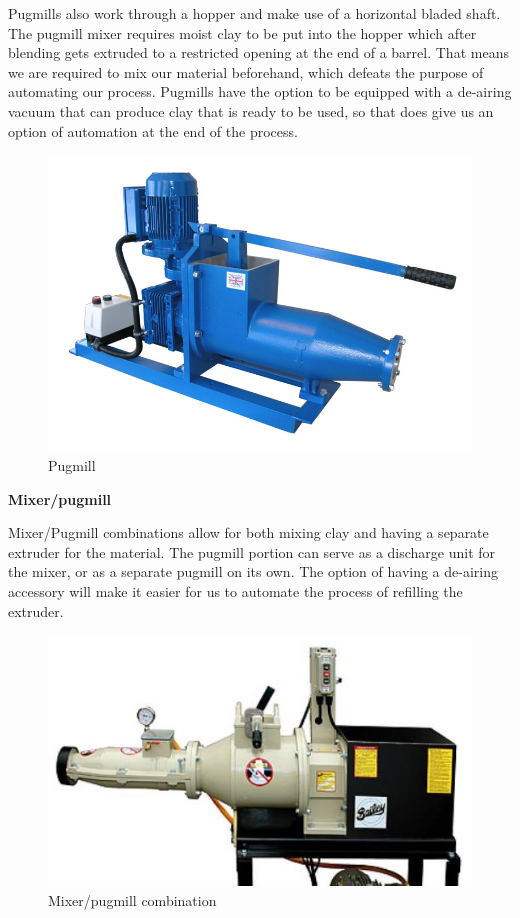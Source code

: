 \documentclass[12pt, a4paper]{article}
\begin{document}
Pugmills also work through a hopper and make use of a horizontal bladed shaft. The pugmill mixer requires moist clay to be put into the hopper which after blending gets extruded to a restricted opening at the end of a barrel. That means we are required to mix our material beforehand, which defeats the purpose of automating our process. Pugmills have the option to be equipped with a de-airing vacuum that can produce clay that is ready to be used, so that does give us an option of automation at the end of the process. 
\begin{figure}[H]
	\centering
	\includegraphics[width=12cm, keepaspectratio]{pugmill}
	\caption{Pugmill}
\end{figure}
	\newpage

\textbf{Mixer/pugmill}

Mixer/Pugmill combinations allow for both mixing clay and having a separate extruder for the material. The pugmill portion can serve as a discharge unit for the mixer, or as a separate pugmill on its own. The option of having a de-airing accessory will make it easier for us to automate the process of refilling the extruder.
\begin{figure}[H]
	\centering
	\includegraphics[width=12cm, keepaspectratio]{pugmixer}
	\caption{Mixer/pugmill combination}
\end{figure}
	\newpage
\end{document}
